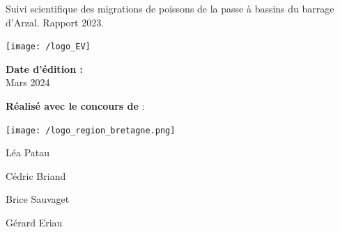 \documentclass[11pt,twocolumn,titlepage,twoside]{article}\usepackage[]{graphicx}\usepackage[]{color}
\begin{document}
\begin{titlepage} 
\thispagestyle{empty}
\begingroup %
%

\hfill%
\begin{minipage}{0.28\textwidth}

\par\sffamily\selectfont
\vspace{4cm}
\Large 
    {\titlefont Suivi scientifique des migrations de poissons 
    de la passe à bassins du barrage d'Arzal.
    Rapport 2023.}\\
\vspace{2cm}

\texttt{[image: /logo\_EV]} 
\end{minipage}
\vfill
\vspace{1.5cm}
\hfill%
\begin{minipage}{0.28\textwidth}
\textbf{
{\titlefont Date d'édition :\\}}
\qquad \color{orange_EV}
\Large
{\titlefont Mars 2024}
\vspace{2cm}

\end{minipage}

       
    
\hfill{ %
\begin{minipage}{0.28\textwidth}
\textbf{Réalisé avec le concours de} : \par
\vspace{1cm}
\texttt{[image: /logo\_region\_bretagne.png]}
\end{minipage}
}%
\vfill
\hfill{ %
\begin{minipage}{0.3\textwidth}
\large
\color{bleu_EV}
\leftskip=1cm
Léa Patau\par
Cédric Briand\par   
Brice Sauvaget\par
Gérard Eriau\par
\vspace{1cm}
\end{minipage}
}%
\endgroup
\end{titlepage}

\end{document}
